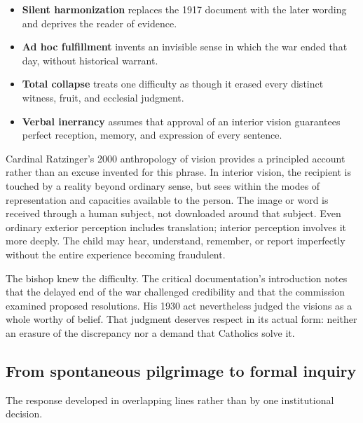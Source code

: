 \begin{itemize}
  \item \textbf{Silent harmonization} replaces the 1917 document with the later wording and deprives the reader of evidence.
  \item \textbf{Ad hoc fulfillment} invents an invisible sense in which the war ended that day, without historical warrant.
  \item \textbf{Total collapse} treats one difficulty as though it erased every distinct witness, fruit, and ecclesial judgment.
  \item \textbf{Verbal inerrancy} assumes that approval of an interior vision guarantees perfect reception, memory, and expression of every sentence.
\end{itemize}

Cardinal Ratzinger's 2000 anthropology of vision provides a principled account rather than an excuse invented for this phrase. In interior vision, the recipient is touched by a reality beyond ordinary sense, but sees within the modes of representation and capacities available to the person. The image or word is received through a human subject, not downloaded around that subject. Even ordinary exterior perception includes translation; interior perception involves it more deeply. The child may hear, understand, remember, or report imperfectly without the entire experience becoming fraudulent.

The bishop knew the difficulty. The critical documentation's introduction notes that the delayed end of the war challenged credibility and that the commission examined proposed resolutions. His 1930 act nevertheless judged the visions as a whole worthy of belief. That judgment deserves respect in its actual form: neither an erasure of the discrepancy nor a demand that Catholics solve it.

\subsection{From spontaneous pilgrimage to formal inquiry}

The response developed in overlapping lines rather than by one institutional decision.

